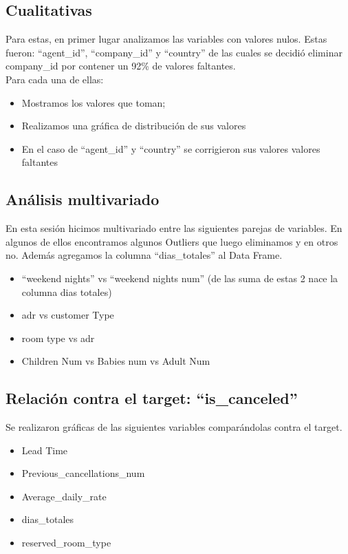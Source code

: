\documentclass{article}
\begin{document}
\subsection*{Cualitativas}
Para estas, en primer lugar analizamos las variables con valores nulos. Estas fueron: “agent\_id”, “company\_id” y “country” de las cuales se decidió eliminar company\_id  por contener un 92\% de valores faltantes.\\
Para cada una de ellas:
\begin{itemize}
	\item Mostramos los valores que toman;
	\item Realizamos una gráfica de distribución de sus valores
	\item En el caso de “agent\_id” y “country” se corrigieron sus valores valores faltantes
\end{itemize}

\subsection*{Análisis multivariado}

En esta sesión hicimos multivariado entre las siguientes parejas de variables. En algunos de ellos encontramos algunos Outliers que luego eliminamos y en otros no. Además agregamos la columna “dias\_totales” al Data Frame.

\begin{itemize}
	\item “weekend nights” vs “weekend nights num” (de las suma de estas 2 nace la columna dias totales)
	\item adr vs customer Type
	\item room type vs adr
	\item Children Num vs Babies num vs Adult Num
\end{itemize}

\subsection*{Relación contra el target: “is\_canceled”}
Se realizaron gráficas de las siguientes variables comparándolas contra el target. 

\begin{itemize}
	\item Lead Time
	\item Previous\_cancellations\_num
	\item Average\_daily\_rate
	\item dias\_totales
	\item reserved\_room\_type
\end{itemize}
\end{document}
